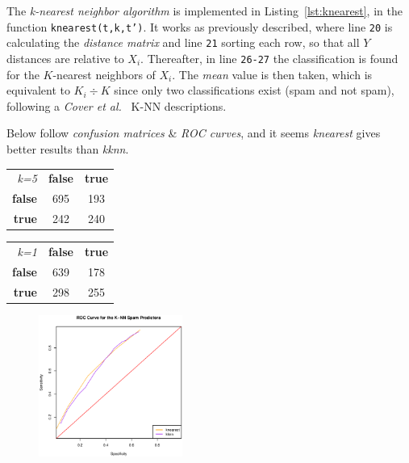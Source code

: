 \documentclass[a4paper, twocolumn]{article}
\begin{document}
    The \emph{k-nearest neighbor algorithm} is implemented in Listing~\ref{lst:knearest}, in the function \texttt{knearest(t,k,t')}. It works as previously described, where line \texttt{20} is calculating the \emph{distance matrix} and line \texttt{21} sorting each row, so that all $Y$ distances are relative to $X_i$. Thereafter, in line \texttt{26-27} the classification is found for the $K$-nearest neighbors of $X_i$. The \emph{mean} value is then taken, which is equivalent to $K_i \div K$ since only two classifications exist (spam and not spam), following a \emph{Cover et al.}~\cite{cover1967nearest} K-NN descriptions.

    Below follow \emph{confusion matrices} \& \emph{ROC curves}, and it seems \emph{knearest} gives better results than \emph{kknn}.

    \begin{table}[h]
    \begin{center}
    \begin{tabular}{r|c|c|}
        \multicolumn{1}{r}{\emph{k=5}}
        &\multicolumn{1}{c}{\textbf{false}}
        &\multicolumn{1}{c}{\textbf{true}} \\
        \cline{2-3}
        \textbf{false} & 695 & 193 \\
        \cline{2-3}
        \textbf{true} & 242 & 240 \\
        \cline{2-3}
    \end{tabular}
    \begin{tabular}{r|c|c|}
        \multicolumn{1}{r}{\emph{k=1}}
        &\multicolumn{1}{c}{\textbf{false}}
        &\multicolumn{1}{c}{\textbf{true}} \\
        \cline{2-3}
        \textbf{false} & 639 & 178 \\
        \cline{2-3}
        \textbf{true} & 298 & 255 \\
        \cline{2-3}
    \end{tabular}
    \end{center}
    \end{table}

    \begin{figure}[h!]
        \centering
        \includegraphics[width=0.42\textwidth]{share/spam.eps}
    \end{figure}
\end{document}
